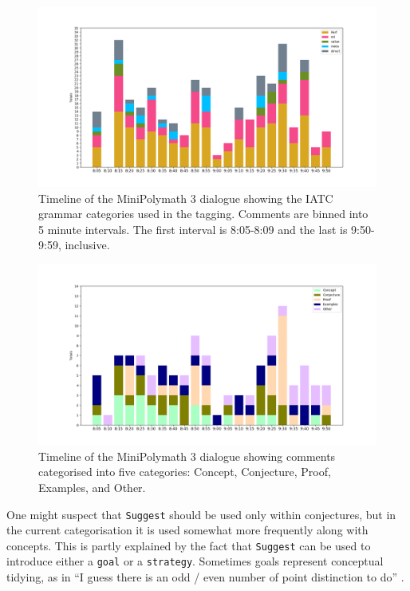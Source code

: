 \documentclass[smallextended,oneside]{svjour3}       %
\let\cite\citep
\newcommand\nothing[1]{#1}
\let\paragraph\nothing
\begin{document}
{\begin{figure}[h]
\begin{center}
\includegraphics[trim=3cm 1.2cm 3cm 1.2cm,clip=true,width=\textwidth]{grammar-categories-revised}
\end{center}
\caption{Timeline of the MiniPolymath 3 dialogue showing the IATC grammar categories used in the tagging.   Comments are binned into 5 minute intervals.  The first interval is 8:05-8:09 and the last is 9:50-9:59, inclusive.
\label{fig:grammar-categories}}
\end{figure}

\begin{figure}[h]
\begin{center}
\includegraphics[trim=3cm 1.2cm 3cm 1.2cm,clip=true,width=\textwidth]{alternative}
\end{center}
\caption{Timeline of the MiniPolymath 3 dialogue showing comments categorised into five categories: Concept, Conjecture, Proof, Examples, and Other.
\label{fig:alternative}}
\end{figure}

\paragraph{One might suspect that \texttt{Suggest} should be used only within conjectures, but in the current categorisation it is used somewhat more frequently along with concepts.}
This is partly explained by the fact that \texttt{Suggest} can be used
to introduce either a \texttt{goal} or a \texttt{strategy}.  Sometimes goals
represent conceptual tidying, as in ``I guess there is an odd / even
number of point distinction to do'' \cite[\href{https://wp.me/pAG2F-41\#comment-3398}{July 19, 9:31 pm}]{tao2011imo}.

}
\end{document}
